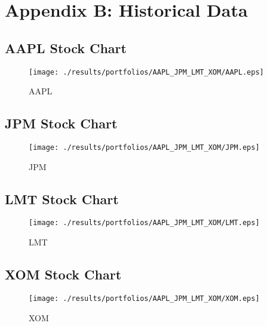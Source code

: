 %

\section{Appendix B: Historical Data}
\label{sec:appendix_b}

\subsection{AAPL Stock Chart}
\begin{figure}[H]
\begin{center}
\texttt{[image: ./results/portfolios/AAPL\_JPM\_LMT\_XOM/AAPL.eps]}
\end{center}
\caption{AAPL}
\label{fig:history_aapl}
\end{figure}

\subsection{JPM Stock Chart}
\begin{figure}[H]
\begin{center}
\texttt{[image: ./results/portfolios/AAPL\_JPM\_LMT\_XOM/JPM.eps]}
\end{center}
\caption{JPM}
\label{fig:history_jnj}
\end{figure}

\subsection{LMT Stock Chart}
\begin{figure}[H]
\begin{center}
\texttt{[image: ./results/portfolios/AAPL\_JPM\_LMT\_XOM/LMT.eps]}
\end{center}
\caption{LMT}
\label{fig:history_lmt}
\end{figure}

\subsection{XOM Stock Chart}
\begin{figure}[H]
\begin{center}
\texttt{[image: ./results/portfolios/AAPL\_JPM\_LMT\_XOM/XOM.eps]}
\end{center}
\caption{XOM}
\label{fig:history_xom}
\end{figure}

